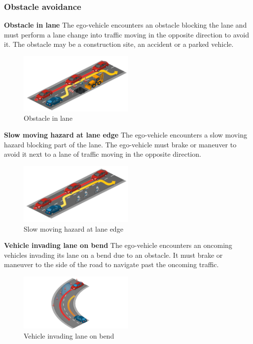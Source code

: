 \documentclass{article}
\begin{document}
\subsubsection{Obstacle avoidance}
\textbf{Obstacle in lane}
The ego-vehicle encounters an obstacle blocking the lane and must perform a lane change into traffic moving in the opposite direction to avoid it.
The obstacle may be a construction site, an accident or a parked vehicle.
\begin{figure}[h]
    \centering
    \includegraphics[width=0.5\textwidth]{img/TR14a.png}
    \caption{Obstacle in lane} \label{Scenario_obstacle}
\end{figure}

\textbf{Slow moving hazard at lane edge}
The ego-vehicle encounters a slow moving hazard blocking part of the lane. The ego-vehicle must brake or maneuver to avoid it next to a lane of traffic
moving in the opposite direction.
\begin{figure}[h]
    \centering
    \includegraphics[width=0.5\textwidth]{img/TR16a.png}
    \caption{Slow moving hazard at lane edge} \label{Scenario_slowMove}
\end{figure}

\textbf{Vehicle invading lane on bend}
The ego-vehicle encounters an oncoming vehicles invading its lane on a bend due to an obstacle. It must brake or maneuver to the side of the road
to navigate past the oncoming traffic.
\begin{figure}[h]
    \centering
    \includegraphics[width=0.5\textwidth]{img/TR22.png}
    \caption{Vehicle invading lane on bend} \label{Scenario_vehicleInvading}
\end{figure}
\end{document}
